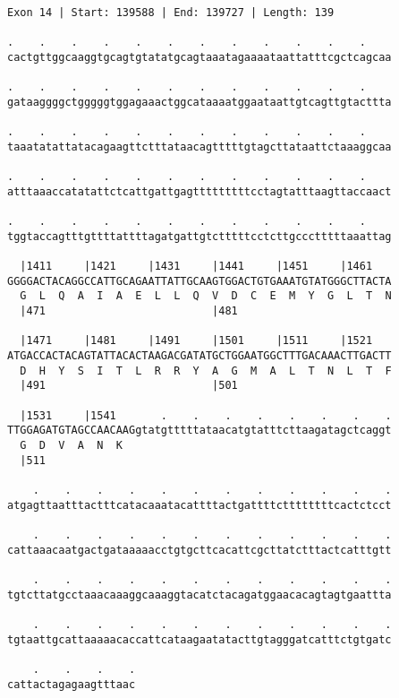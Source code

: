 \documentclass{article}
\begin{document}
\begin{Verbatim}[fontfamily=courier]
Exon 14 | Start: 139588 | End: 139727 | Length: 139

.    .    .    .    .    .    .    .    .    .    .    .    
cactgttggcaaggtgcagtgtatatgcagtaaatagaaaataattatttcgctcagcaa

.    .    .    .    .    .    .    .    .    .    .    .    
gataaggggctgggggtggagaaactggcataaaatggaataattgtcagttgtacttta

.    .    .    .    .    .    .    .    .    .    .    .    
taaatatattatacagaagttctttataacagtttttgtagcttataattctaaaggcaa

.    .    .    .    .    .    .    .    .    .    .    .    
atttaaaccatatattctcattgattgagtttttttttcctagtatttaagttaccaact

.    .    .    .    .    .    .    .    .    .    .    .    
tggtaccagtttgttttattttagatgattgtctttttcctcttgccctttttaaattag

  |1411     |1421     |1431     |1441     |1451     |1461   
GGGGACTACAGGCCATTGCAGAATTATTGCAAGTGGACTGTGAAATGTATGGGCTTACTA
  G  L  Q  A  I  A  E  L  L  Q  V  D  C  E  M  Y  G  L  T  N
  |471                          |481                        

  |1471     |1481     |1491     |1501     |1511     |1521   
ATGACCACTACAGTATTACACTAAGACGATATGCTGGAATGGCTTTGACAAACTTGACTT
  D  H  Y  S  I  T  L  R  R  Y  A  G  M  A  L  T  N  L  T  F
  |491                          |501                        

  |1531     |1541       .    .    .    .    .    .    .    .
TTGGAGATGTAGCCAACAAGgtatgtttttataacatgtatttcttaagatagctcaggt
  G  D  V  A  N  K                                          
  |511                                                      

    .    .    .    .    .    .    .    .    .    .    .    .
atgagttaatttactttcatacaaatacattttactgattttcttttttttcactctcct

    .    .    .    .    .    .    .    .    .    .    .    .
cattaaacaatgactgataaaaacctgtgcttcacattcgcttatctttactcatttgtt

    .    .    .    .    .    .    .    .    .    .    .    .
tgtcttatgcctaaacaaaggcaaaggtacatctacagatggaacacagtagtgaattta

    .    .    .    .    .    .    .    .    .    .    .    .
tgtaattgcattaaaaacaccattcataagaatatacttgtagggatcatttctgtgatc

    .    .    .    .
cattactagagaagtttaac
\end{Verbatim}
\newpage
\end{document}
